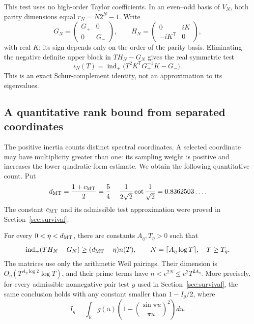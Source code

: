 This test uses no high-order Taylor coefficients. In an even--odd
basis of \(V_N\), both parity dimensions equal
\(r_N=N2^N-1\). Write
\[
 G_N=\begin{pmatrix}G_+&0\\0&G_-\end{pmatrix},\qquad
 H_N=\begin{pmatrix}0&iK\\-iK^{\mathsf T}&0\end{pmatrix},
\]
with real \(K\); its sign depends only on the order of the parity
basis. Eliminating the negative definite upper block in
\(T H_N-G_N\) gives the real symmetric test
\[
 \iota_N(T)=\operatorname{ind}_+
       \bigl(T^2K^{\mathsf T}G_+^{-1}K-G_-\bigr).
\]
This is an exact Schur-complement identity, not an approximation to
its eigenvalues.

\subsection{A quantitative rank bound from separated coordinates}
\label{subsec:strong-inertia-density}

The positive inertia counts distinct spectral coordinates. A selected
coordinate may have multiplicity greater than one: its sampling weight
is positive and increases the lower quadratic-form estimate. We obtain
the following quantitative count. Put
\[
 d_{\rm MT}=\frac{1+c_{\rm MT}}2
 =\frac54-\frac1{2\sqrt2}\cot\frac1{\sqrt2}
 =0.8362503\ldots.
\]
The constant \(c_{\rm MT}\) and its admissible test approximation
were proved in Section~\ref{sec:survival}.

\begin{theorem}
\label{thm:strong-inertia-density}
For every \(0<\eta<d_{\rm MT}\), there are constants
\(A_\eta,T_\eta>0\) such that
\[
 \operatorname{ind}_+(T H_N-G_N)\ge(d_{\rm MT}-\eta)n(T),
 \qquad N=\lceil A_\eta\log T\rceil,\quad T\ge T_\eta.
\]
The matrices use only the arithmetic Weil pairings. Their dimension is
\(O_\eta(T^{A_\eta\log2}\log T)\), and their prime terms have
\(n<e^{2N}\le e^2T^{2A_\eta}\).
More precisely, for every admissible nonnegative pair test \(g\) used
in Section~\ref{sec:survival}, the same conclusion holds with any
constant smaller than \(1-I_g/2\), where
\[
 I_g=\int_{\mathbb R}g(u)
      \left(1-\left(\frac{\sin\pi u}{\pi u}\right)^2\right)du.
\]
\end{theorem}

